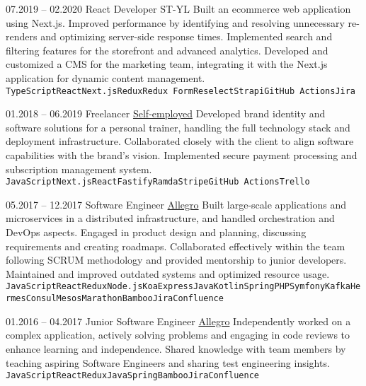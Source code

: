 \documentclass[9pt]{config}
\begin{document}
\begin{entrylist}
  \entry
  {07.2019 -- 02.2020}
  {React Developer}
  {ST-YL}
  {Built an ecommerce web application using Next.js. Improved performance by identifying and resolving unnecessary re-renders and optimizing server-side response times. Implemented search and filtering features for the storefront and advanced analytics. Developed and customized a CMS for the marketing team, integrating it with the Next.js application for dynamic content management.}
  {\texttt{TypeScript}\slashsep\texttt{React}\slashsep\texttt{Next.js}\slashsep\texttt{Redux}\slashsep\texttt{Redux Form}\slashsep\texttt{Reselect}\slashsep\texttt{Strapi}\slashsep\texttt{GitHub Actions}\slashsep\texttt{Jira}}

  \entry
  {01.2018 -- 06.2019}
  {Freelancer}
  {\href{https://jsarnowski.com}{Self-employed}}
  {Developed brand identity and software solutions for a personal trainer, handling the full technology stack and deployment infrastructure. Collaborated closely with the client to align software capabilities with the brand's vision. Implemented secure payment processing and subscription management system.}
  {\texttt{JavaScript}\slashsep\texttt{Next.js}\slashsep\texttt{React}\slashsep\texttt{Fastify}\slashsep\texttt{Ramda}\slashsep\texttt{Stripe}\slashsep\texttt{GitHub Actions}\slashsep\texttt{Trello}}

  \entry
  {05.2017 -- 12.2017}
  {Software Engineer}
  {\href{https://allegro.pl}{Allegro}}
  {Built large-scale applications and microservices in a distributed
    infrastructure, and handled orchestration and DevOps aspects.
    Engaged in product design and planning, discussing requirements
    and creating roadmaps. Collaborated effectively within the team
    following SCRUM methodology and provided mentorship to junior
    developers. Maintained and improved outdated systems and
  optimized resource usage.}
  {\texttt{JavaScript}\slashsep\texttt{React}\slashsep\texttt{Redux}\slashsep\texttt{Node.js}\slashsep\texttt{Koa}\slashsep\texttt{Express}\slashsep\texttt{Java}\slashsep\texttt{Kotlin}\slashsep\texttt{Spring}\slashsep\texttt{PHP}\slashsep\texttt{Symfony}\slashsep\texttt{Kafka}\slashsep\texttt{Hermes}\slashsep\texttt{Consul}\slashsep\texttt{Mesos}\slashsep\texttt{Marathon}\slashsep\texttt{Bamboo}\slashsep\texttt{Jira}\slashsep\texttt{Confluence}}

  \entry
  {01.2016 -- 04.2017}
  {Junior Software Engineer}
  {\href{https://allegro.pl}{Allegro}}
  {Independently worked on a complex application, actively solving
    problems and engaging in code reviews to enhance learning and
    independence. Shared knowledge with team members by teaching
  aspiring Software Engineers and sharing test engineering insights.}
  {\texttt{JavaScript}\slashsep\texttt{React}\slashsep\texttt{Redux}\slashsep\texttt{Java}\slashsep\texttt{Spring}\slashsep\texttt{Bamboo}\slashsep\texttt{Jira}\slashsep\texttt{Confluence}}


\end{entrylist}
\end{document}
